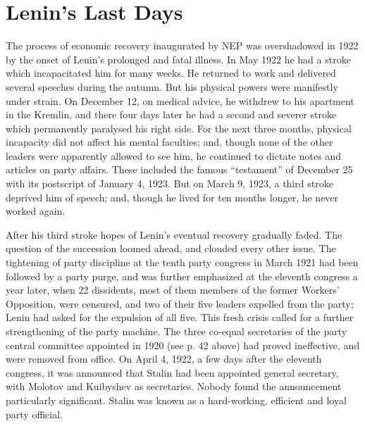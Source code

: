 \chapter{Lenin's Last Days}

The process of economic recovery inaugurated by NEP was overshadowed in 1922 by the onset of Lenin's prolonged and fatal illness. In May 1922 he had a stroke which incapacitated him for many weeks. He returned to work and delivered several speeches during the autumn. But his physical powers were manifestly under strain. On December 12, on medical advice, he withdrew to his apartment in the Kremlin, and there four days later he had a second and severer stroke which permanently paralysed his right side. For the next three months, physical incapacity did not affect his mental faculties; and, though none of the other leaders were apparently allowed to see him, he continued to dictate notes and articles on party affairs. These included the famous ``testament'' of December 25 with its postscript of January 4, 1923. But on March 9, 1923, a third stroke deprived him of speech; and, though he lived for ten months longer, he never worked again. 

After his third stroke hopes of Lenin's eventual recovery gradually faded. The question of the succession loomed ahead, and clouded every other issue. The tightening of party discipline at the tenth party congress in March 1921 had been followed by a party purge, and was further emphasized at the eleventh congress a year later, when 22 dissidents, most of them members of the former Workers' Opposition, were censured, and two of their five leaders expelled from the party; Lenin had asked for the expulsion of all five. This fresh crisis called for a further strengthening of the party machine. The three co-equal secretaries of the party central committee appointed in 1920 (see p. 42 above) had proved ineffective, and were removed from office. On April 4, 1922, a few days after the eleventh congress, it was announced that Stalin had been appointed general secretary, with Molotov and Kuibyshev as secretaries. Nobody found the announcement particularly significant. Stalin was known as a hard-working, efficient and loyal party official. 

